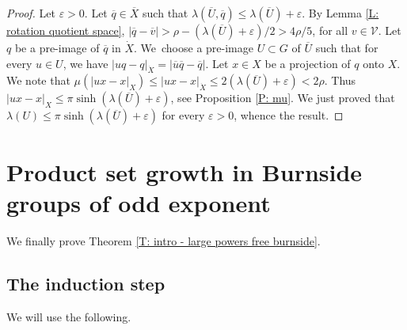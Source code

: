 \documentclass[11pt]{article}
\let\mathcal\mathscr
\let\epsilon\varepsilon
\theoremstyle{plain}
\theoremstyle{definition}
\newcommand{\cX}{\dot{X}}
\newcommand{\q}[1]{\overline{#1}}
\begin{document}
\begin{proof}
Let $\epsilon > 0$.
Let $\q q \in \q X$ such that $\lambda(\q U, \q q) \leq \lambda(\q U) + \epsilon$.
By Lemma \ref{L: rotation quotient space}, $|\q q - \q v|> \rho - (\lambda(\q U)+\epsilon)/2>4\rho/5$, for all $v \in \mathcal V$.
Let $q$ be a pre-image of $\q q$ in $\cX$.
We~choose a pre-image $U \subset G$ of $\q U$ such that for every $u \in U$, we have $|uq-q|_{\cX}=|\q u \q q -\q q|$.
Let $x\in X$ be a projection of $q$ onto $X$. We note that $\mu (|ux-x|_X)\leqslant |ux-x|_{\cX}\leqslant 2(\lambda(\q U) +\epsilon)<2\rho$.
Thus $|ux-x|_X\leqslant \pi \sinh (\lambda(\q U)+\epsilon)$, see Proposition \ref{P: mu}.
We just proved that $\lambda(U) \leq \pi \sinh (\lambda(\q U)+\epsilon)$ for every $\epsilon > 0$, whence the result.
\end{proof}

\section{Product set growth in Burnside groups of odd exponent}

We finally prove Theorem \ref{T: intro - large powers free burnside}.

\subsection{The induction step}

We will use the following.
\end{document}
